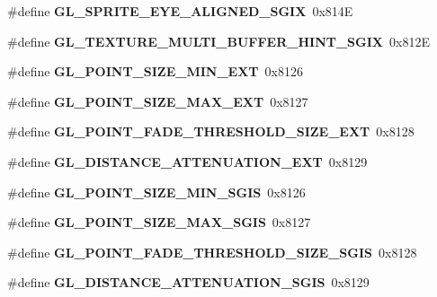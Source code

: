 \begin{DoxyCompactItemize}
\item 
\#define {\bfseries G\+L\+\_\+\+S\+P\+R\+I\+T\+E\+\_\+\+E\+Y\+E\+\_\+\+A\+L\+I\+G\+N\+E\+D\+\_\+\+S\+G\+I\+X}~0x814\+E\label{_s_d_l__opengl_8h_a7ea4e65caf90481efafc305159f0f185}

\item 
\#define {\bfseries G\+L\+\_\+\+T\+E\+X\+T\+U\+R\+E\+\_\+\+M\+U\+L\+T\+I\+\_\+\+B\+U\+F\+F\+E\+R\+\_\+\+H\+I\+N\+T\+\_\+\+S\+G\+I\+X}~0x812\+E\label{_s_d_l__opengl_8h_a82d6df544287d02d9d12561c7916f7c1}

\item 
\#define {\bfseries G\+L\+\_\+\+P\+O\+I\+N\+T\+\_\+\+S\+I\+Z\+E\+\_\+\+M\+I\+N\+\_\+\+E\+X\+T}~0x8126\label{_s_d_l__opengl_8h_afe264fc08310763751800ab65fa8b369}

\item 
\#define {\bfseries G\+L\+\_\+\+P\+O\+I\+N\+T\+\_\+\+S\+I\+Z\+E\+\_\+\+M\+A\+X\+\_\+\+E\+X\+T}~0x8127\label{_s_d_l__opengl_8h_a8436839348d23154e3869c6aeffbc7af}

\item 
\#define {\bfseries G\+L\+\_\+\+P\+O\+I\+N\+T\+\_\+\+F\+A\+D\+E\+\_\+\+T\+H\+R\+E\+S\+H\+O\+L\+D\+\_\+\+S\+I\+Z\+E\+\_\+\+E\+X\+T}~0x8128\label{_s_d_l__opengl_8h_a20802b84f5a710f59572b85b834d7e06}

\item 
\#define {\bfseries G\+L\+\_\+\+D\+I\+S\+T\+A\+N\+C\+E\+\_\+\+A\+T\+T\+E\+N\+U\+A\+T\+I\+O\+N\+\_\+\+E\+X\+T}~0x8129\label{_s_d_l__opengl_8h_ab4f79e552bfa98366ff4977cbc9304a4}

\item 
\#define {\bfseries G\+L\+\_\+\+P\+O\+I\+N\+T\+\_\+\+S\+I\+Z\+E\+\_\+\+M\+I\+N\+\_\+\+S\+G\+I\+S}~0x8126\label{_s_d_l__opengl_8h_a168c6e44294003b78965a6f0b9417d69}

\item 
\#define {\bfseries G\+L\+\_\+\+P\+O\+I\+N\+T\+\_\+\+S\+I\+Z\+E\+\_\+\+M\+A\+X\+\_\+\+S\+G\+I\+S}~0x8127\label{_s_d_l__opengl_8h_a15487da0f06c6715e5b98a1341ae0ce0}

\item 
\#define {\bfseries G\+L\+\_\+\+P\+O\+I\+N\+T\+\_\+\+F\+A\+D\+E\+\_\+\+T\+H\+R\+E\+S\+H\+O\+L\+D\+\_\+\+S\+I\+Z\+E\+\_\+\+S\+G\+I\+S}~0x8128\label{_s_d_l__opengl_8h_a06ce158d471f57cd4a86b08f6b54d8b1}

\item 
\#define {\bfseries G\+L\+\_\+\+D\+I\+S\+T\+A\+N\+C\+E\+\_\+\+A\+T\+T\+E\+N\+U\+A\+T\+I\+O\+N\+\_\+\+S\+G\+I\+S}~0x8129\label{_s_d_l__opengl_8h_a019f70d7665ba490146d48ea2c72e86b}


\end{DoxyCompactItemize}
